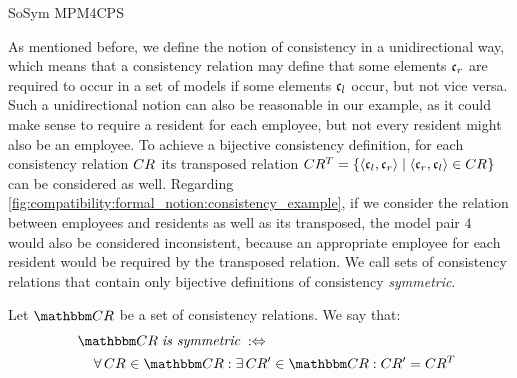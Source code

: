 \begin{copiedFrom}{SoSym MPM4CPS}

As mentioned before, we define the notion of consistency in a unidirectional way, which means that a consistency relation may define that some elements $\mathfrak{c}_{r}$ are required to occur in a set of models if some elements $\mathfrak{c}_{l}$ occur, but not vice versa.
Such a unidirectional notion can also be reasonable in our example, as it could make sense to require a resident for each employee, but not every resident might also be an employee.
To achieve a bijective consistency definition, for each consistency relation $CR_{}$ its transposed relation $CR^T_{} = \{ \langle \mathfrak{c}_{l}, \mathfrak{c}_{r} \rangle \mid \langle \mathfrak{c}_{r}, \mathfrak{c}_{l} \rangle \in CR_{} \}$ can be considered as well.
Regarding \autoref{fig:compatibility:formal_notion:consistency_example}, if we consider the relation between employees and residents as well as its transposed, the model pair $4$ would also be considered inconsistent, because an appropriate employee for each resident would be required by the transposed relation.
We call sets of consistency relations that contain only bijective definitions of consistency \emph{symmetric}.

\begin{definition}
    Let $\consistencyrelationset{CR}$ be a set of consistency relations.
    We say that:
    \begin{align*}
        \formulaskip &
        \consistencyrelationset{CR} \mathtext{is symmetric} \equivalentperdefinition \\
        & \formulaskip
        \forall \consistencyrelation{CR}{} \in \consistencyrelationset{CR} :
        \exists \consistencyrelation{CR'}{} \in \consistencyrelationset{CR} :
        \consistencyrelation{CR'}{} = \consistencyrelation{CR^T}{}
    \end{align*}
\end{definition}


\end{copiedFrom}
